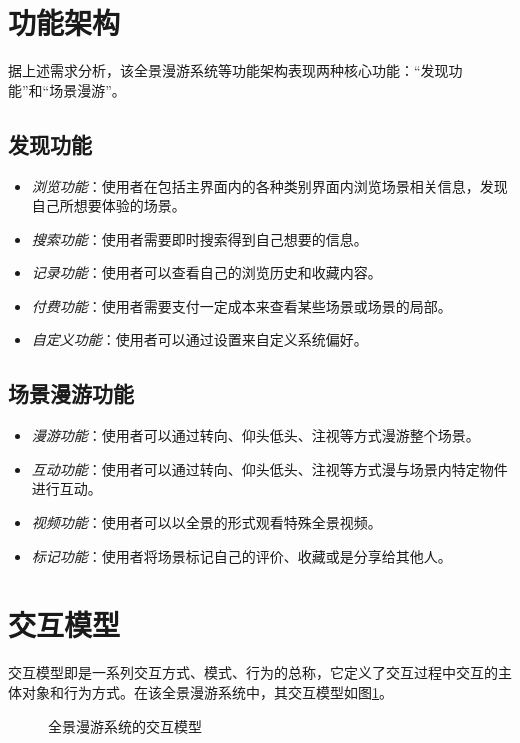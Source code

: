 \section{功能架构}
据上述需求分析，该全景漫游系统等功能架构表现两种核心功能：“发现功能”和“场景漫游”。

\subsection{发现功能}
\begin{itemize}
	\item \emph{浏览功能}：使用者在包括主界面内的各种类别界面内浏览场景相关信息，发现自己所想要体验的场景。
	\item \emph{搜索功能}：使用者需要即时搜索得到自己想要的信息。
	\item \emph{记录功能}：使用者可以查看自己的浏览历史和收藏内容。
	\item \emph{付费功能}：使用者需要支付一定成本来查看某些场景或场景的局部。
	\item \emph{自定义功能}：使用者可以通过设置来自定义系统偏好。
\end{itemize}

\subsection{场景漫游功能}

\begin{itemize}
	\item \emph{漫游功能}：使用者可以通过转向、仰头低头、注视等方式漫游整个场景。
	\item \emph{互动功能}：使用者可以通过转向、仰头低头、注视等方式漫与场景内特定物件进行互动。
	\item \emph{视频功能}：使用者可以以全景的形式观看特殊全景视频。
	\item \emph{标记功能}：使用者将场景标记自己的评价、收藏或是分享给其他人。
\end{itemize}

\section{交互模型}
交互模型即是一系列交互方式、模式、行为的总称，它定义了交互过程中交互的主体对象和行为方式。在该全景漫游系统中，其交互模型如图\ref{fig:scene}。

\begin{figure}[htp]
\centering
{}
\caption{全景漫游系统的交互模型}
\label{fig:scene}
\end{figure}

